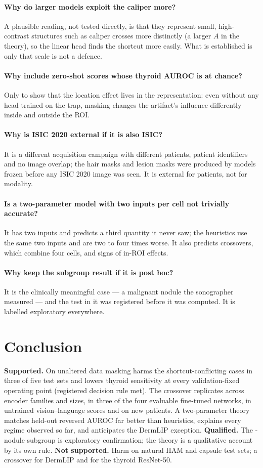 \paragraph{Why do larger models exploit the caliper more?} A plausible reading, not tested directly, is that they
represent small, high-contrast structures such as caliper crosses more distinctly (a larger $A$ in the theory), so the
linear head finds the shortcut more easily. What is established is only that scale is not a defence.
\paragraph{Why include zero-shot scores whose thyroid AUROC is at chance?} Only to show that the location effect lives in
the representation: even without any head trained on the trap, masking changes the artifact's influence differently
inside and outside the ROI.
\paragraph{Why is ISIC 2020 external if it is also ISIC?} It is a different acquisition campaign with different patients,
patient identifiers and no image overlap; the hair masks and lesion masks were produced by models frozen before any ISIC
2020 image was seen. It is external for patients, not for modality.
\paragraph{Is a two-parameter model with two inputs per cell not trivially accurate?} It has two inputs and predicts a
third quantity it never saw; the heuristics use the same two inputs and are two to four times worse. It also predicts
crossovers, which combine four cells, and signs of in-ROI effects.
\paragraph{Why keep the subgroup result if it is post hoc?} It is the clinically meaningful case --- a malignant nodule the
sonographer measured --- and the test in it was registered before it was computed. It is labelled exploratory everywhere.

\section{Conclusion}
\textbf{Supported.} On unaltered data masking harms the shortcut-conflicting cases in three of five test sets and lowers
thyroid sensitivity at every validation-fixed operating point (registered decision rule met). The crossover replicates
across encoder families and sizes, in three of the four evaluable fine-tuned networks, in untrained vision--language
scores and on new patients. A two-parameter theory matches held-out reversed AUROC far better than heuristics, explains
every regime observed so far, and anticipates the DermLIP exception. \textbf{Qualified.} The \sFiveNConf-nodule subgroup
is exploratory confirmation; the theory is a qualitative account by its own rule. \textbf{Not supported.} Harm on natural
HAM and capsule test sets; a crossover for DermLIP and for the thyroid ResNet-50.

